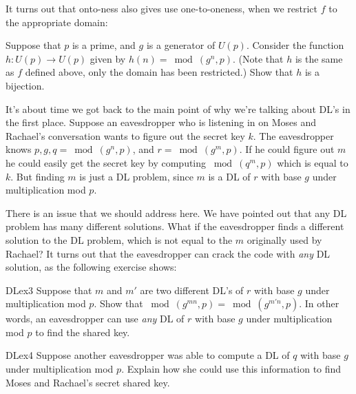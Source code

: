 It turns out that onto-ness also gives use one-to-oneness, when we restrict $f$ to the appropriate domain:

\begin{exercise}{} 
Suppose that $p$ is a prime, and $g$ is a generator of $U(p)$.  Consider the function $h: U(p) \rightarrow U(p)$ given by $h(n) = \bmod(g^n,p)$.  (Note that $h$ is the same as $f$ defined above, only the domain has been restricted.)  Show that $h$ is a bijection.
\end{exercise}

It's about time we got back to the main point of why we're talking about  DL's in the first place.  Suppose an eavesdropper who is listening in on Moses and Rachael's conversation wants to figure out the secret key $k$. 
The eavesdropper knows $p, g, q=\bmod(g^n,p)$, and $r=\bmod(g^m,p)$.   If he could figure out $m$ he could easily get the secret key by computing $\bmod(q^m,p)$ which is equal to $k$.   But finding $m$  is just  a DL problem, since $m$ is a DL of $r$ with base $g$ under multiplication mod $p$.  

There is an issue that we should address here. We have pointed out that any DL problem has many different solutions. What if the eavesdropper finds a different solution to the DL problem, which is not equal to the $m$ originally used by Rachael? It turns out that the eavesdropper can crack the code with \emph{any} DL solution, as the following exercise shows:

\begin{exercise}{DLex3}
Suppose that $m$ and $m'$ are two different DL's of $r$ with base $g$ under multiplication mod $p$.  Show that $\bmod(g^{mn},p)=\bmod(g^{m'n},p)$. In other words, an eavesdropper can use \emph{any} DL of $r$ with base $g$ under multiplication mod $p$ to find the shared key.
\end{exercise}

\begin{exercise}{DLex4}
Suppose another eavesdropper was able to compute a DL of $q$ with base $g$ under multiplication mod $p$.  Explain how she could use this information to find Moses and Rachael's secret shared key.
\end{exercise}

